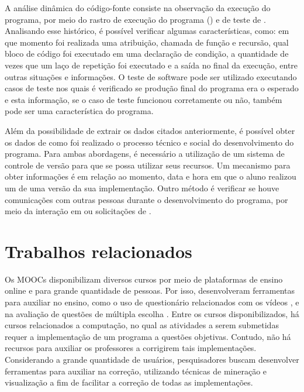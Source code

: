 			A análise dinâmica do código-fonte consiste na observação da execução do
			programa, por meio do rastro de execução do programa () e
			de teste de . Analisando esse histórico, é possível
			verificar algumas características, como: em que momento foi realizada
			uma atribuição, chamada de função e recursão, qual bloco de código foi
			executado em uma declaração de condição, a quantidade de vezes que um laço
			de repetição foi executado e a saída no final da execução, entre outras situações
			e informações. O teste de software pode ser utilizado executando casos de teste
			nos quais é verificado se produção final do programa era o esperado e esta
			informação, se o caso de teste funcionou corretamente ou não, também pode
			ser uma característica do programa.
			
			Além da possibilidade de extrair os dados citados anteriormente, é possível
			obter os dados de como foi realizado o processo técnico e social do desenvolvimento
			do programa. Para ambas abordagens, é necessário a utilização de um sistema de
			controle de versão para que se possa utilizar seus recursos. Um mecanismo para
			obter informações é em relação ao momento, data e hora em que o aluno realizou
			um  de uma versão da sua implementação. Outro método é verificar
			se houve comunicações com outras pessoas durante o desenvolvimento do programa,
			por meio da interação em  ou solicitações de .
			

	\section{Trabalhos relacionados}
	\label{sec:TrabRel}
	
		Os \acs{MOOC}s disponibilizam diversos cursos por meio de plataformas de ensino
		online e para grande quantidade de pessoas. Por isso, desenvolveram ferramentas
		para auxiliar no ensino, como o uso de questionário relacionados com os vídeos
		\cite{fassbinder2014}, e na avaliação de questões de múltipla escolha \cite{alario2013analysing}.
		Entre os cursos disponibilizados, há cursos relacionados a computação, no qual
		as atividades a serem submetidas requer a implementação de um programa a
		questões objetivas. Contudo, não há recursos para auxiliar os professores
		a corrigirem tais implementações. Considerando a grande quantidade de usuários,
		pesquisadores buscam desenvolver ferramentas para auxiliar na correção,
		utilizando técnicas de mineração e visualização a fim de facilitar a correção
		de todas as implementações.
	

